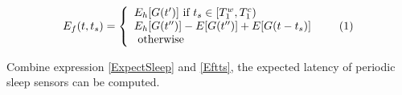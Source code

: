 \documentclass[conference]{IEEEtran}
\newcommand\numberthis{\addtocounter{equation}{1}\tag{\theequation}}
\begin{document}
\begin{align*}
E_f(t,t_s)=\left\{
\begin{array}{lr}
E_h[G(t')]\text{ if } t_s\in [T^{w}_{1}, T^{c}_{1})\\
E_h[G(t'')]-E[G(t'')]+E[G(t-t_s)]\\
\text{ otherwise }
\end{array}\numberthis \label{Eftts}
\right.
\end{align*}

Combine expression \eqref{ExpectSleep} and \eqref{Eftts}, the expected latency of periodic sleep sensors can be computed.
\end{document}
